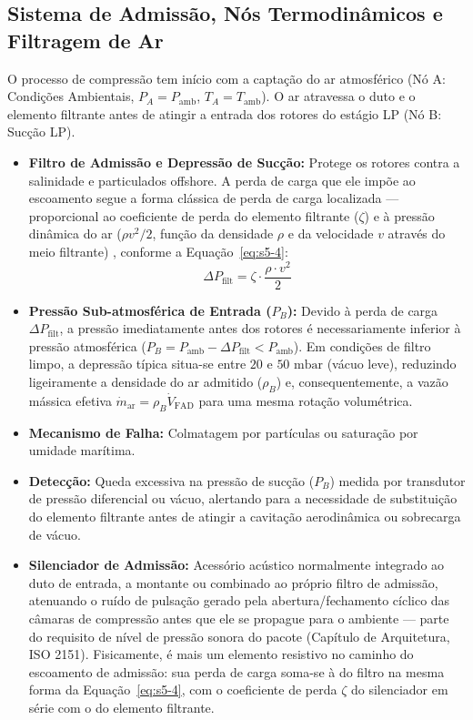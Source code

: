 \documentclass[12pt,a4paper]{article}
\numberwithin{equation}{section}
\numberwithin{table}{section}
\numberwithin{figure}{section}
\begin{document}
{	\subsection{\textbf{Sistema de Admissão, Nós Termodinâmicos e Filtragem de Ar}}
	O processo de compressão tem início com a captação do ar atmosférico (Nó A: Condições Ambientais, $P_A = P_{\text{amb}}$, $T_A = T_{\text{amb}}$). O ar atravessa o duto e o elemento filtrante antes de atingir a entrada dos rotores do estágio LP (Nó B: Sucção LP).
	\begin{itemize}
		\item \textbf{Filtro de Admissão e Depressão de Sucção:} Protege os rotores contra a salinidade e particulados offshore. A perda de carga que ele impõe ao escoamento segue a forma clássica de perda de carga localizada — proporcional ao coeficiente de perda do elemento filtrante ($\zeta$) e à pressão dinâmica do ar ($\rho v^2/2$, função da densidade $\rho$ e da velocidade $v$ através do meio filtrante) \cite{white}, conforme a Equação~\eqref{eq:s5-4}:
		\begin{equation}\label{eq:s5-4}
 \Delta P_{\text{filt}} = \zeta \cdot \frac{\rho \cdot v^2}{2}
\end{equation}
		\item \textbf{Pressão Sub-atmosférica de Entrada ($P_B$):} Devido à perda de carga $\Delta P_{\text{filt}}$, a pressão imediatamente antes dos rotores é necessariamente inferior à pressão atmosférica ($P_B = P_{\text{amb}} - \Delta P_{\text{filt}} < P_{\text{amb}}$). Em condições de filtro limpo, a depressão típica situa-se entre $20$ e $50\text{ mbar}$ (vácuo leve), reduzindo ligeiramente a densidade do ar admitido ($\rho_B$) e, consequentemente, a vazão mássica efetiva $\dot{m}_{\text{ar}} = \rho_B \dot{V}_{\text{FAD}}$ para uma mesma rotação volumétrica.
		\item \textbf{Mecanismo de Falha:} Colmatagem por partículas ou saturação por umidade marítima.
		\item \textbf{Detecção:} Queda excessiva na pressão de sucção ($P_B$) medida por transdutor de pressão diferencial ou vácuo, alertando para a necessidade de substituição do elemento filtrante antes de atingir a cavitação aerodinâmica ou sobrecarga de vácuo.
		\item \textbf{Silenciador de Admissão:} Acessório acústico normalmente integrado ao duto de entrada, a montante ou combinado ao próprio filtro de admissão, atenuando o ruído de pulsação gerado pela abertura/fechamento cíclico das câmaras de compressão antes que ele se propague para o ambiente — parte do requisito de nível de pressão sonora do pacote (Capítulo de Arquitetura, ISO 2151). Fisicamente, é mais um elemento resistivo no caminho do escoamento de admissão: sua perda de carga soma-se à do filtro na mesma forma da Equação~\eqref{eq:s5-4}, com o coeficiente de perda $\zeta$ do silenciador em série com o do elemento filtrante.
	\end{itemize}

}
\end{document}
